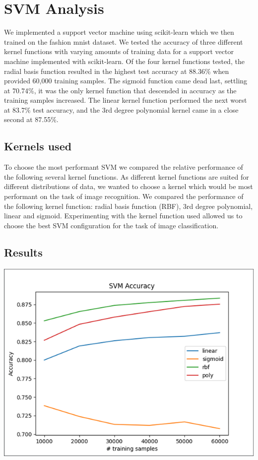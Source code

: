 \documentclass[12pt]{article}
\begin{document}
\section{SVM Analysis}

We implemented a support vector machine using scikit-learn which we then trained on the fashion mnist dataset. We tested the accuracy of three different kernel functions with varying amounts of training data for a support vector machine implemented with scikit-learn. Of the four kernel functions tested, the radial basis function resulted in the highest test accuracy at 88.36\% when provided 60,000 training samples. The sigmoid function came dead last, settling at 70.74\%, it was the only kernel function that descended in accuracy as the training samples increased. The linear kernel function performed the next worst at 83.7\% test accuracy, and the 3rd degree polynomial kernel came in a close second at 87.55\%.

\subsection{Kernels used}

To choose the most performant SVM we compared the relative performance of the following several kernel functions. As different kernel functions are suited for different distributions of data, we wanted to choose a kernel which would be most performant on the task of image recognition. We compared the performance of the following kernel function: radial basis function (RBF), 3rd degree polynomial, linear and sigmoid. Experimenting with the kernel function used allowed us to choose the best SVM configuration for the task of image classification.

\subsection{Results}

\includegraphics[scale=.75]{svmgraph1.PNG} 
\end{document}
